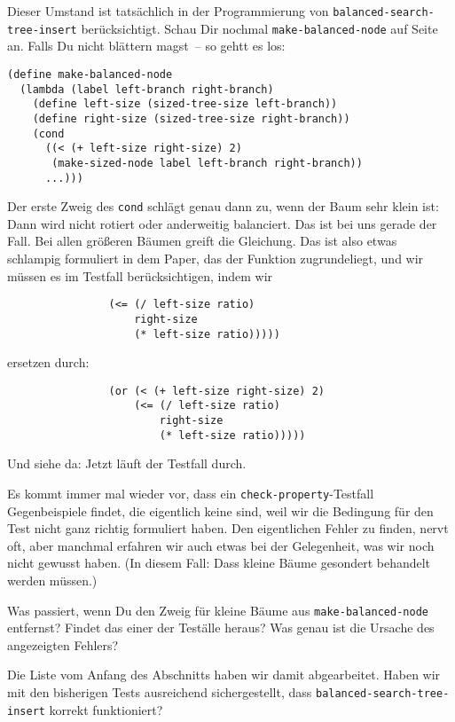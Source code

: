 Dieser Umstand ist tatsächlich in der Programmierung von
\lstinline{balanced-search-tree-insert} berücksichtigt.  Schau Dir
nochmal \lstinline{make-balanced-node} auf
Seite~\pageref{func:make-balanced-node} an.  Falls Du nicht blättern
magst~-- so gehtt es los:
%
\begin{lstlisting}
(define make-balanced-node
  (lambda (label left-branch right-branch)
    (define left-size (sized-tree-size left-branch))
    (define right-size (sized-tree-size right-branch))
    (cond
      ((< (+ left-size right-size) 2)
       (make-sized-node label left-branch right-branch))
      ...)))
\end{lstlisting}
%
Der erste Zweig des \lstinline{cond} schlägt genau dann zu, wenn der
Baum sehr klein ist: Dann wird nicht rotiert oder anderweitig
balanciert.  Das ist bei uns gerade der Fall.  Bei allen größeren
Bäumen greift die Gleichung.  Das ist also etwas schlampig formuliert
in dem Paper, das der Funktion zugrundeliegt, und wir müssen es im
Testfall berücksichtigen, indem wir
%
\begin{lstlisting}
                (<= (/ left-size ratio)
                    right-size
                    (* left-size ratio)))))
\end{lstlisting}
%
ersetzen durch:
%
\begin{lstlisting}
                (or (< (+ left-size right-size) 2)
                    (<= (/ left-size ratio)
                        right-size
                        (* left-size ratio)))))
\end{lstlisting}
%
Und siehe da: Jetzt läuft der Testfall durch.

Es kommt immer mal wieder vor, dass ein
\lstinline{check-property}-Testfall Gegenbeispiele findet, die
eigentlich keine sind, weil wir die Bedingung für den Test nicht ganz
richtig formuliert haben.  Den eigentlichen Fehler zu finden, nervt
oft, aber manchmal erfahren wir auch etwas bei der Gelegenheit, was
wir noch nicht gewusst haben.  (In diesem Fall: Dass kleine Bäume
gesondert behandelt werden müssen.)
%
\begin{aufgabeinline}
  Was passiert, wenn Du den Zweig für kleine Bäume aus
  \lstinline{make-balanced-node} entfernst?  Findet das einer der
  Teställe heraus?  Was genau ist die Ursache des angezeigten Fehlers?
\end{aufgabeinline}
%
Die Liste vom Anfang des Abschnitts haben wir damit abgearbeitet.
Haben wir mit den bisherigen Tests ausreichend sichergestellt, dass
\lstinline{balanced-search-tree-insert} korrekt funktioniert?

